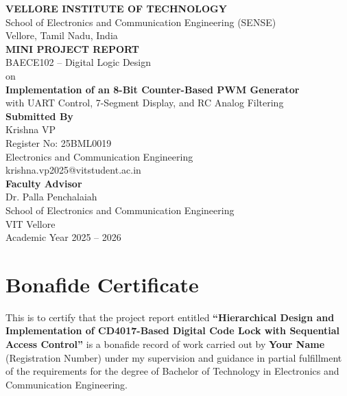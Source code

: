 \documentclass[12pt,a4paper]{article}
\begin{document}
\begin{center}
{\Large \textbf{VELLORE INSTITUTE OF TECHNOLOGY}} \\[0.2cm]
{\large School of Electronics and Communication Engineering (SENSE)} \\
{\large Vellore, Tamil Nadu, India} \\[1cm]

{\Large \textbf{MINI PROJECT REPORT}} \\[0.3cm]
{\large BAECE102 -- Digital Logic Design} \\[0.3cm]
{\large on} \\[0.3cm]
{\Large \textbf{Implementation of an 8-Bit Counter-Based PWM Generator}} \\
{\large with UART Control, 7-Segment Display, and RC Analog Filtering} \\[1.5cm]

{\large \textbf{Submitted By}} \\[0.2cm]
{\large Krishna VP} \\
{\large Register No: 25BML0019} \\
{\large Electronics and Communication Engineering} \\
{\large krishna.vp2025@vitstudent.ac.in} \\[1cm]

{\large \textbf{Faculty Advisor}} \\[0.2cm]
{\large Dr. Palla Penchalaiah} \\
{\large School of Electronics and Communication Engineering} \\
{\large VIT Vellore} \\[1cm]

{\large Academic Year 2025 -- 2026}
\end{center}

\newpage

\clearpage
\chapter*{Bonafide Certificate}

This is to certify that the project report entitled \textbf{``Hierarchical Design and Implementation of CD4017-Based Digital Code Lock with Sequential Access Control''} is a bonafide record of work carried out by \textbf{Your Name} (Registration Number) under my supervision and guidance in partial fulfillment of the requirements for the degree of Bachelor of Technology in Electronics and Communication Engineering.
\end{document}
